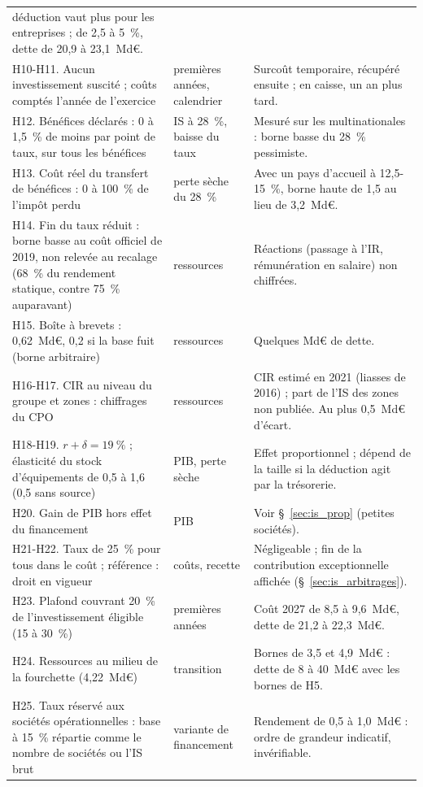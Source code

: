 \begin{table}[!htbp]
\begin{tabularx}{\linewidth}{@{}>{\raggedright\arraybackslash}p{4.4cm}>{\raggedright\arraybackslash}p{2.4cm}>{\raggedright\arraybackslash}X@{}}
déduction vaut plus pour les entreprises ; de 2,5 à 5~\%, dette de 20,9 à 23,1~Md€. \\
H10-H11. Aucun investissement suscité ; coûts comptés l'année de l'exercice & premières années, calendrier & Surcoût
temporaire, récupéré ensuite ; en caisse, un an plus tard. \\
H12. Bénéfices déclarés : 0 à 1,5~\% de moins par point de taux, sur tous les bénéfices & IS à 28~\%, baisse du taux &
Mesuré sur les multinationales : borne basse du 28~\% pessimiste. \\
H13. Coût réel du transfert de bénéfices : 0 à 100~\% de l'impôt perdu & perte sèche du 28~\% & Avec un pays d'accueil
à 12,5-15~\%, borne haute de 1,5 au lieu de 3,2~Md€. \\
H14. Fin du taux réduit : borne basse au coût officiel de 2019, non relevée au recalage (68~\% du rendement statique,
contre 75~\% auparavant) & ressources & Réactions (passage à l'IR, rémunération en
salaire) non chiffrées. \\
H15. Boîte à brevets : 0,62~Md€, 0,2 si la base fuit (borne arbitraire) & ressources & Quelques Md€ de dette. \\
H16-H17. CIR au niveau du groupe et zones : chiffrages du CPO & ressources & CIR estimé en 2021 (liasses de 2016) ;
part de l'IS des zones non publiée. Au plus 0,5~Md€ d'écart. \\
H18-H19. $r+\delta = 19~\%$ ; élasticité du stock d'équipements de 0,5 à 1,6 (0,5 sans source) & PIB, perte sèche &
Effet proportionnel ; dépend de la taille si la déduction agit par la trésorerie. \\
H20. Gain de PIB hors effet du financement & PIB & Voir §~\ref{sec:is_prop} (petites sociétés). \\
H21-H22. Taux de 25~\% pour tous dans le coût ; référence : droit en vigueur & coûts, recette & Négligeable ; fin de la
contribution exceptionnelle affichée (§~\ref{sec:is_arbitrages}). \\
H23. Plafond couvrant 20~\% de l'investissement éligible (15 à 30~\%) & premières années & Coût 2027 de 8,5 à
9,6~Md€, dette de 21,2 à 22,3~Md€. \\
H24. Ressources au milieu de la fourchette (4,22~Md€) & transition & Bornes de 3,5 et 4,9~Md€ : dette de 8 à 40~Md€
avec les bornes de H5. \\
H25. Taux réservé aux sociétés opérationnelles : base à 15~\% répartie comme le nombre de sociétés ou l'IS brut &
variante de financement & Rendement de 0,5 à 1,0~Md€ : ordre de grandeur indicatif, invérifiable. \\

\end{tabularx}
\end{table}
